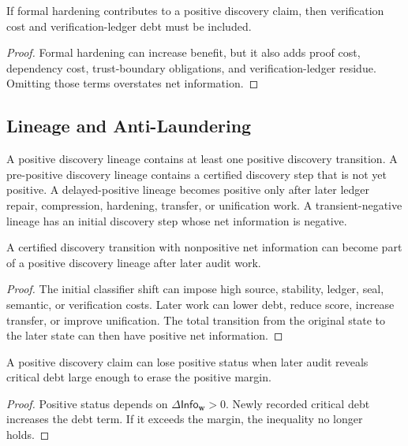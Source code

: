\begin{theorem}
\label{thm:philosophy-verification-assisted-counts-cost}
If formal hardening contributes to a positive discovery claim, then
verification cost and verification-ledger debt must be included.
\end{theorem}
\begin{proof}
Formal hardening can increase benefit, but it also adds proof cost,
dependency cost, trust-boundary obligations, and verification-ledger
residue. Omitting those terms overstates net information.
\end{proof}

\subsection{Lineage and Anti-Laundering}
\label{subsec:philosophy-positive-discovery-lineage-anti-laundering}

\begin{definition}
\label{def:philosophy-positive-discovery-lineages}
A positive discovery lineage contains at least one positive discovery
transition. A pre-positive discovery lineage contains a certified
discovery step that is not yet positive. A delayed-positive lineage
becomes positive only after later ledger repair, compression, hardening,
transfer, or unification work. A transient-negative lineage has an
initial discovery step whose net information is negative.
\end{definition}

\begin{theorem}
\label{thm:philosophy-discovery-can-become-positive-later}
A certified discovery transition with nonpositive net information can
become part of a positive discovery lineage after later audit work.
\end{theorem}
\begin{proof}
The initial classifier shift can impose high source, stability, ledger,
seal, semantic, or verification costs. Later work can lower debt, reduce
score, increase transfer, or improve unification. The total transition
from the original state to the later state can then have positive net
information.
\end{proof}

\begin{theorem}
\label{thm:philosophy-positive-status-can-decay}
A positive discovery claim can lose positive status when later audit
reveals critical debt large enough to erase the positive margin.
\end{theorem}
\begin{proof}
Positive status depends on $\Delta\mathsf{Info}_{\mathbf w}>0$. Newly
recorded critical debt increases the debt term. If it exceeds the margin,
the inequality no longer holds.
\end{proof}

